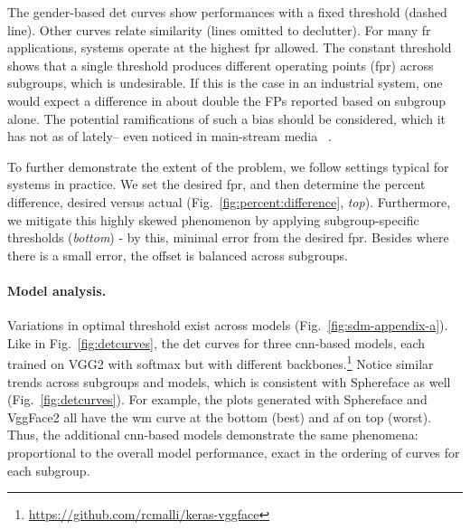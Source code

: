
The gender-based \gls{det} curves show performances with a fixed threshold (dashed line). Other curves relate similarity (lines omitted to declutter). For many \gls{fr} applications, systems operate at the highest \gls{fpr} allowed. The constant threshold shows that a single threshold produces different operating points (\ie \gls{fpr}) across subgroups, which is undesirable. %
If this is the case in an industrial system, one would expect a difference in about double the FPs reported based on subgroup alone. The potential ramifications of such a bias should be considered, which it has not as of lately-- even noticed in main-stream media ~\cite{england2019,snow2018}.

To further demonstrate the extent of the problem, we follow settings typical for systems in practice. We set the desired \gls{fpr}, and then determine the percent difference, \ie desired versus actual (Fig.~\ref{fig:percent:difference}, \emph{top}). Furthermore, we mitigate this highly skewed phenomenon by applying subgroup-specific thresholds (\emph{bottom}) - by this, minimal error from the desired \gls{fpr}. Besides where there is a small error, the offset is balanced across subgroups.

\vspace{-5mm}
\noindent\paragraph{Model analysis.}
Variations in optimal threshold exist across models (Fig.~\ref{fig:sdm-appendix-a}). Like in Fig.~\ref{fig:detcurves}, the \gls{det} curves for three \gls{cnn}-based models, each trained on VGG2 with softmax but with different backbones.\footnote{\href{https://github.com/rcmalli/keras-vggface}{https://github.com/rcmalli/keras-vggface}} Notice similar trends across subgroups and models, which is consistent with  Sphereface as well (Fig.~\ref{fig:detcurves}). For example, the plots generated with Sphereface and VggFace2 all have the \gls{wm} curve at the bottom (\ie best) and \gls{af} on top (\ie worst). Thus, the additional \gls{cnn}-based models demonstrate the same phenomena: proportional to the overall model performance, exact in the ordering of curves for each subgroup.


